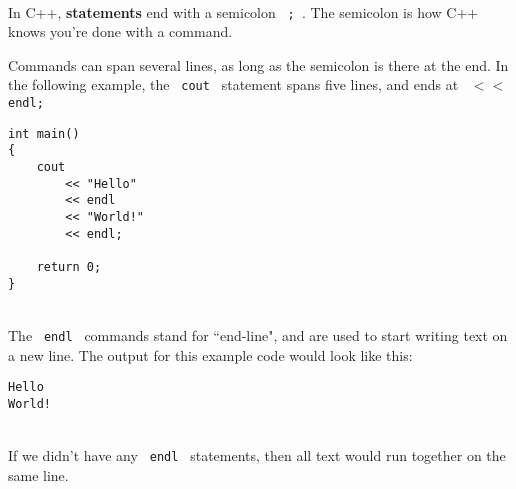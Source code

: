 \documentclass[a4paper,12pt]{book}
\begin{document}
                ~\\
                In C++, \textbf{ statements } end with a semicolon \texttt{ ; }.
                The semicolon is how C++ knows you're done with a command.

                \newpage
                Commands can span several lines, as long as the semicolon
                is there at the end. In the following example, the \texttt{ cout }
                statement spans five lines, and ends at \texttt{ $<<$ endl; } \\

\begin{lstlisting}[style=code]
int main()
{
    cout
        << "Hello"
        << endl
        << "World!"
        << endl;
        
    return 0;
}
\end{lstlisting}

                ~\\
                The \texttt{ endl } commands stand for ``end-line",
                and are used to start writing text on a new line.
                The output for this example code would look like this:

\begin{lstlisting}[style=output]
Hello
World!
\end{lstlisting}

                ~\\
                If we didn't have any \texttt{ endl } statements, then
                all text would run together on the same line.
            
            
\end{document}

